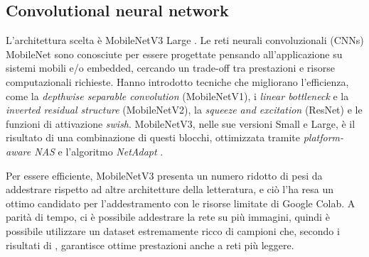 \subsection{Convolutional neural network}

\label{sec:cnn_relu}

L'architettura scelta è MobileNetV3 Large \cite{mobilenetv3}. Le reti neurali convoluzionali (CNNs) MobileNet sono conosciute per essere progettate pensando all'applicazione su sistemi mobili e/o embedded, cercando un trade-off tra prestazioni e risorse computazionali richieste. Hanno introdotto tecniche che migliorano l'efficienza, come la \emph{depthwise separable convolution} (MobileNetV1), i \emph{linear bottleneck} e la \emph{inverted residual structure} (MobileNetV2), la \emph{squeeze and excitation} (ResNet) e le funzioni di attivazione \emph{swish}. MobileNetV3, nelle sue versioni Small e Large, è il risultato di una combinazione di questi blocchi, ottimizzata tramite \emph{platform-aware NAS} e l'algoritmo \emph{NetAdapt} \cite{mobilenetv3}. 

Per essere efficiente, MobileNetV3 presenta un numero ridotto di pesi da addestrare rispetto ad altre architetture della letteratura, e ciò l'ha resa un ottimo candidato per l'addestramento con le risorse limitate di Google Colab. A parità di tempo, ci è possibile addestrare la rete su più immagini, quindi è possibile utilizzare un dataset estremamente ricco di campioni che, secondo i risultati di \cite{miviaage}, garantisce ottime prestazioni anche a reti più leggere.

